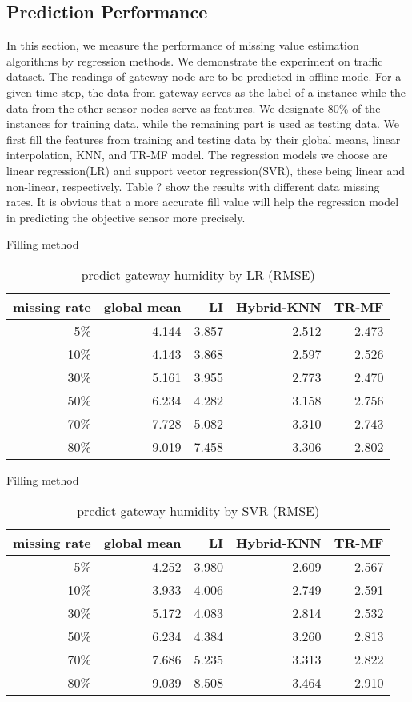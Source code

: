 \subsection{Prediction Performance}
In this section, we measure the performance of missing value estimation algorithms by regression methods.
We demonstrate the experiment on traffic dataset.
The readings of gateway node are to be predicted in offline mode.
For a given time step, the data from gateway serves as the label of a instance while the data from the other sensor nodes serve as features.
We designate 80\% of the instances for training data, while the remaining part is used as testing data.
We first fill the features from training and testing data by their global means, linear interpolation, KNN, and TR-MF model.
The regression models we choose are linear regression(LR) and support vector regression(SVR), these being linear and non-linear, respectively.
Table ? show the results with different data missing rates.
It is obvious that a more accurate fill value will help the regression model in predicting the objective sensor more precisely.

\begin{table} [htbp]
\setlength{\tabcolsep}{2pt}
\centering
\caption{predict gateway humidity by LR (RMSE) }
\label{table: LR}
   Filling method
\begin{tabular}{ r | r r r r}
        missing rate&global mean     &LI   &Hybrid-KNN &TR-MF\\ \hline
        5\%      &4.144&3.857&2.512&2.473\\
        10\%    &4.143&3.868& 2.597&2.526\\
        30\%    &5.161&3.955&2.773&2.470\\
        50\%    &6.234&4.282&3.158&2.756\\
        70\%   &7.728&5.082&3.310&2.743\\
        80\%   &9.019&7.458&3.306&2.802\\
\end{tabular}
\end{table}

\begin{table}[htbp]
\setlength{\tabcolsep}{2pt}
\centering
\caption{predict gateway humidity by SVR (RMSE) }
\label{table: SVR}
   Filling method
\begin{tabular}{ r | r r r r}
        missing rate&global mean     &LI   &Hybrid-KNN &TR-MF\\ \hline
        5\%&4.252&3.980&2.609&2.567\\
        10\%    &3.933 &4.006&2.749&2.591\\
        30\%    &5.172&4.083&2.814&2.532\\
        50\%    &6.234&4.384&3.260&2.813\\
        70\%   &7.686&5.235&3.313&2.822\\
        80\%  &9.039&8.508&3.464&2.910\\
\end{tabular}
\end{table}

